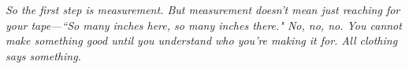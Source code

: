 \clearpage
\thispagestyle{empty}

\vspace*{\fill}
\begin{adjustwidth}{1in}{1in}
  \textit{So the first step is measurement. But measurement doesn't mean just
          reaching for your tape---``So many inches here, so many inches there."
          No, no, no. You cannot make something good until you understand who
          you’re making it for. All clothing says something.}
\end{adjustwidth}
\vspace*{\fill}

\restoregeometry
\doublespace
